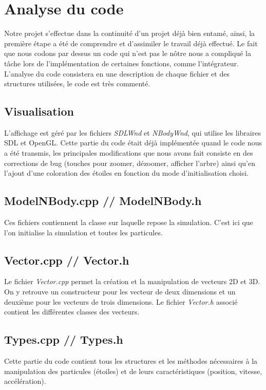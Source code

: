 \chapter{Analyse du code}

Notre projet s'effectue dans la continuité d'un projet déjà bien entamé, ainsi, la première étape a été de comprendre et d'assimiler le travail déjà effectué. Le fait que nous codons par dessus un code qui n'est pas le nôtre nous a compliqué la tâche lors de l'implémentation de certaines fonctions, comme l'intégrateur. L'analyse du code consistera en une description de chaque fichier et des structures utilisées, le code est très commenté.

\section{Visualisation}
L'affichage est géré par les fichiers \textit{SDLWnd} et \textit{NBodyWnd}, qui utilise les libraires SDL et OpenGL. Cette partie du code était déjà implémentée quand le code nous a été transmis, les principales modifications que nous avons fait consiste en des corrections de bug (touches pour zoomer, dézoomer, afficher l'arbre) ainsi qu'en l'ajout d'une coloration des étoiles en fonction du mode d'initialisation choisi.

\section{ModelNBody.cpp // ModelNBody.h}
Ces fichiers contiennent la classe sur laquelle repose la simulation. C'est ici que l'on initialise la simulation et toutes les particules.

\section{Vector.cpp // Vector.h}
Le fichier \textit{Vector.cpp} permet la création et la manipulation de vecteurs 2D et 3D. On y retrouve un constructeur pour les vecteur de deux dimensions et un deuxième pour les vecteurs de trois dimensions. Le fichier \textit{Vector.h} associé contient les différentes classes des vecteurs.

\section{Types.cpp // Types.h}
Cette partie du code contient tous les structures et les méthodes nécessaires à la manipulation des particules (étoiles) et de leurs caractéristiques (position, vitesse, accélération).

